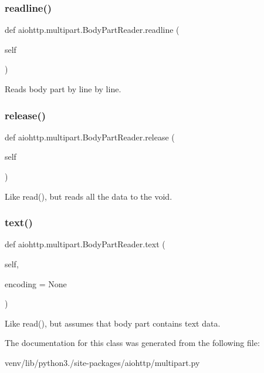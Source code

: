 \subsubsection{\texorpdfstring{readline()}{readline()}}
{\footnotesize\ttfamily def aiohttp.\+multipart.\+Body\+Part\+Reader.\+readline (\begin{DoxyParamCaption}\item[{}]{self }\end{DoxyParamCaption})}

\begin{DoxyVerb}Reads body part by line by line.\end{DoxyVerb}
 \mbox{\label{classaiohttp_1_1multipart_1_1_body_part_reader_a23130082f378478f6da9e09168c34a11}} 
\subsubsection{\texorpdfstring{release()}{release()}}
{\footnotesize\ttfamily def aiohttp.\+multipart.\+Body\+Part\+Reader.\+release (\begin{DoxyParamCaption}\item[{}]{self }\end{DoxyParamCaption})}

\begin{DoxyVerb}Like read(), but reads all the data to the void.\end{DoxyVerb}
 \mbox{\label{classaiohttp_1_1multipart_1_1_body_part_reader_a96751ec0eae97861585e2596c361fcb8}} 
\subsubsection{\texorpdfstring{text()}{text()}}
{\footnotesize\ttfamily def aiohttp.\+multipart.\+Body\+Part\+Reader.\+text (\begin{DoxyParamCaption}\item[{}]{self,  }\item[{}]{encoding = {\ttfamily None} }\end{DoxyParamCaption})}

\begin{DoxyVerb}Like read(), but assumes that body part contains text data.\end{DoxyVerb}
 

The documentation for this class was generated from the following file\+:\begin{DoxyCompactItemize}
\item 
venv/lib/python3./site-\/packages/aiohttp/multipart.\+py\end{DoxyCompactItemize}
